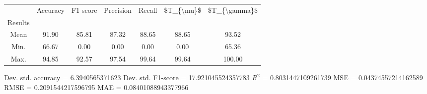 \begin{tabular}{|c|c|c|c|c|c|c|}
\toprule
{} &  Accuracy &  F1 score &  Precision &  Recall &  \$T\_\{\textbackslash mu\}\$ &  \$T\_\{\textbackslash gamma\}\$ \\
Results &           &           &            &         &            &               \\
\hline
Mean    &     91.90 &     85.81 &      87.32 &   88.65 &      88.65 &         93.52 \\
Min.    &     66.67 &      0.00 &       0.00 &    0.00 &       0.00 &         65.36 \\
Max.    &     94.85 &     92.57 &      97.54 &   99.64 &      99.64 &        100.00 \\
\bottomrule
\end{tabular}

 Dev. std. accuracy = 6.3940565371623
 Dev. std. F1-score = 17.921045524357783
 $R^2$ = 0.8031447109261739
 MSE = 0.04374557214162589
 RMSE = 0.2091544217596795
 MAE = 0.08401088943377966